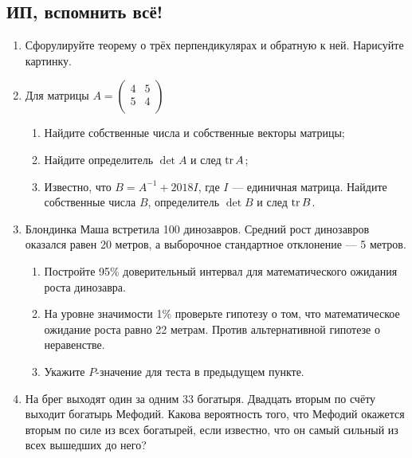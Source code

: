 
\subsection{ИП, вспомнить всё!}

\begin{enumerate}

  \item Сфорулируйте теорему о трёх перпендикулярах и обратную к ней. Нарисуйте картинку.

  \item Для матрицы
$
  A=\begin{pmatrix}
  4 & 5  \\
  5 & 4  \\
  \end{pmatrix}
$

  \begin{enumerate}
  \item Найдите собственные числа и собственные векторы матрицы;
  \item Найдите определитель $\det A$ и след $\tr A$;
 \item Известно, что $B = A^{-1} + 2018I$, где $I$ — единичная матрица.
 Найдите собственные числа $B$, определитель $\det B$ и след $\tr B$.

  \end{enumerate}


  \item Блондинка Маша встретила 100 динозавров.
  Средний рост динозавров оказался равен 20 метров, а выборочное стандартное отклонение — 5 метров.

  \begin{enumerate}
    \item Постройте 95\% доверительный интервал для математического ожидания роста динозавра.
    \item На уровне значимости 1\% проверьте гипотезу о том, что математическое ожидание
    роста равно 22 метрам. Против альтернативной гипотезе о неравенстве.
    \item Укажите $P$-значение для теста в предыдущем пункте.
  \end{enumerate}

 \item На брег выходят один за одним 33 богатыря. Двадцать вторым по счёту выходит
 богатырь Мефодий. Какова вероятность того, что Мефодий окажется вторым по силе из всех богатырей,
   если известно, что он самый сильный из всех вышедших до него?

\end{enumerate}


